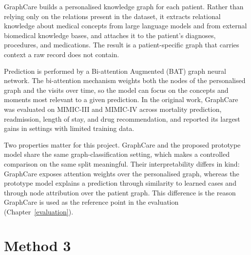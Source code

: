 GraphCare builds a personalised knowledge graph for each patient. Rather than
relying only on the relations present in the dataset, it extracts relational
knowledge about medical concepts from large language models and from external
biomedical knowledge bases, and attaches it to the patient's diagnoses,
procedures, and medications. The result is a patient-specific graph that carries
context a raw record does not contain.

Prediction is performed by a Bi-attention Augmented (BAT) graph neural network.
The bi-attention mechanism weights both the nodes of the personalised graph and
the visits over time, so the model can focus on the concepts and moments most
relevant to a given prediction. In the original work, GraphCare was evaluated on
MIMIC-III and MIMIC-IV across mortality prediction, readmission, length of stay,
and drug recommendation, and reported its largest gains in settings with limited
training data.

Two properties matter for this project. GraphCare and the proposed prototype
model share the same graph-classification setting, which makes a controlled
comparison on the same split meaningful. Their interpretability differs in kind:
GraphCare exposes attention weights over the personalised graph, whereas the
prototype model explains a prediction through similarity to learned cases and
through node attribution over the patient graph. This difference is the reason
GraphCare is used as the reference point in the evaluation
(Chapter~\ref{evaluation}).

\section{Method 3}
\label{sec:method3}